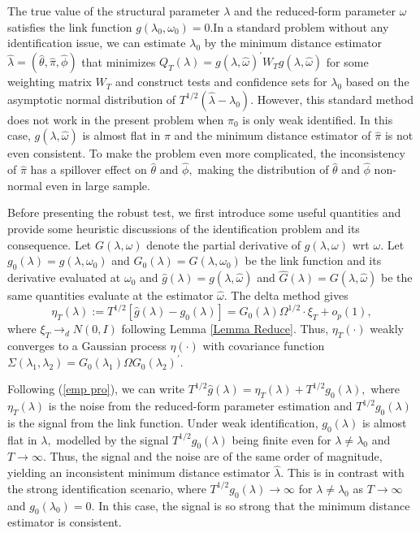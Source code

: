 \documentclass[11pt]{article}
\begin{document}
The true value of the structural parameter $\lambda $ and the reduced-form
parameter $\omega $ satisfies the link function $g(\lambda _{0},\omega
_{0})=0.$In a standard problem without any identification issue, we can
estimate $\lambda _{0}$ by the minimum distance estimator $\widehat{\lambda }%
=(\widehat{\theta },\widehat{\pi },\widehat{\phi })$ that minimizes $%
Q_{T}(\lambda )=g(\lambda ,\widehat{\omega })^{\prime }W_{T}g(\lambda ,%
\widehat{\omega })$ for some weighting matrix $W_{T}$ and construct tests
and confidence sets for $\lambda _{0}$ based on the asymptotic normal
distribution of $T^{1/2}(\widehat{\lambda }-\lambda _{0})$. However, this
standard method does not work in the present problem when $\pi _{0}$ is only
weak identified. In this case, $g(\lambda ,\widehat{\omega })$ is almost
flat in $\pi $ and the minimum distance estimator of $\widehat{\pi }$ is not
even consistent. To make the problem even more complicated, the
inconsistency of $\widehat{\pi }$ has a spillover effect on $\widehat{\theta 
}$ and $\widehat{\phi },$ making the distribution of $\widehat{\theta }$ and 
$\widehat{\phi }$ non-normal even in large sample.

Before presenting the robust test, we first introduce some useful quantities
and provide some heuristic discussions of the identification problem and its
consequence. Let $G(\lambda ,\omega )$ denote the partial derivative of $%
g(\lambda ,\omega )$ wrt $\omega .$ Let $g_{0}(\lambda )=g(\lambda ,\omega
_{0})$ and $G_{0}(\lambda )=G(\lambda ,\omega _{0})$ be the link function
and its derivative evaluated at $\omega _{0}$ and $\widehat{g}(\lambda
)=g(\lambda ,\widehat{\omega })$ and $\widehat{G}(\lambda )=G(\lambda ,%
\widehat{\omega })$ be the same quantities evaluate at the estimator $%
\widehat{\omega }.$ The delta method gives 
\begin{equation}
\eta _{T}(\lambda ):=T^{1/2}\left[ \widehat{g}(\lambda )-g_{0}(\lambda )%
\right] =G_{0}(\lambda )\Omega ^{1/2}\cdot \xi _{T}+o_{p}(1),
\label{emp pro}
\end{equation}%
where $\xi _{T}\rightarrow _{d}N(0,I)$ following Lemma \ref{Lemma Reduce}.
Thus, $\eta _{T}(\cdot )$ weakly converges to a Gaussian process $\eta
(\cdot )$ with covariance function $\Sigma (\lambda _{1},\lambda
_{2})=G_{0}(\lambda _{1})\Omega G_{0}(\lambda _{2})^{\prime }.$

Following (\ref{emp pro}), we can write $T^{1/2}\widehat{g}(\lambda )=\eta
_{T}(\lambda )+T^{1/2}g_{0}(\lambda ),$ where $\eta _{T}(\lambda )$ is the
noise from the reduced-form parameter estimation and $T^{1/2}g_{0}(\lambda )$
is the signal from the link function. Under weak identification, $%
g_{0}(\lambda )$ is almost flat in $\lambda ,$ modelled by the signal $%
T^{1/2}g_{0}(\lambda )$ being finite even for $\lambda \neq \lambda _{0}$
and $T\rightarrow \infty .$ Thus, the signal and the noise are of the same
order of magnitude, yielding an inconsistent minimum distance estimator $%
\widehat{\lambda }.$ This is in contrast with the strong identification
scenario, where $T^{1/2}g_{0}(\lambda )\rightarrow \infty $ for $\lambda
\neq \lambda _{0}$ as $T\rightarrow \infty $ and $g_{0}(\lambda _{0})=0.$ In
this case, the signal is so strong that the minimum distance estimator is
consistent.
\end{document}
